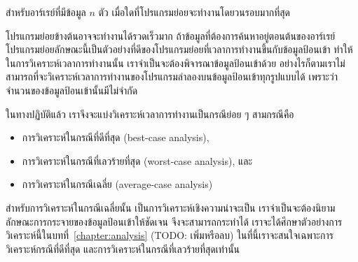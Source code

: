 \begin{quiz}{}
สำหรับ{\wbr}อาร์{\wbr}เรย์{\wbr}ที่{\wbr}มี{\wbr}ข้อมูล $n$ ตัว เมื่อใด{\wbr}ที่{\wbr}โปรแกรม{\wbr}ย่อย{\wbr}จะ{\wbr}ทำงาน{\wbr}โดย{\wbr}วน{\wbr}รอบ{\wbr}มาก{\wbr}ที่สุด{\wbr}
\end{quiz}

โปรแกรม{\wbr}ย่อย{\wbr}ข้าง{\wbr}ต้น{\wbr}อาจ{\wbr}จะ{\wbr}ทำงาน{\wbr}ได้{\wbr}รวดเร็ว{\wbr}มาก ถ้า{\wbr}ข้อมูล{\wbr}ที่{\wbr}ต้องการ{\wbr}ค้น{\wbr}หา{\wbr}อยู่{\wbr}ตอน{\wbr}ต้น{\wbr}ของ{\wbr}อาร์{\wbr}เรย์
โปรแกรม{\wbr}ย่อย{\wbr}ลักษณะ{\wbr}นี้{\wbr}เป็น{\wbr}ตัวอย่าง{\wbr}ที่{\wbr}ดี{\wbr}ของ{\wbr}โปรแกรม{\wbr}ย่อย{\wbr}ที่{\wbr}เวลา{\wbr}การ{\wbr}ทำงาน{\wbr}ขึ้น{\wbr}กับ{\wbr}ข้อมูล{\wbr}ป้อน{\wbr}เข้า{\wbr}
ทำให้{\wbr}ใน{\wbr}การ{\wbr}วิเคราะห์{\wbr}เวลา{\wbr}การ{\wbr}ทำงาน{\wbr}นั้น เรา{\wbr}จำเป็น{\wbr}จะ{\wbr}ต้อง{\wbr}พิจารณา{\wbr}ข้อมูล{\wbr}ป้อน{\wbr}เข้า{\wbr}ด้วย{\wbr}
อย่างไร{\wbr}ก็{\wbr}ตาม{\wbr}เรา{\wbr}ไม่{\wbr}สามารถ{\wbr}ที่{\wbr}จะ{\wbr}วิเคราะห์{\wbr}เวลา{\wbr}การ{\wbr}ทำงาน{\wbr}ของ{\wbr}โปรแกรม{\wbr}ลำลอง{\wbr}บน{\wbr}ข้อมูล{\wbr}ป้อน{\wbr}เข้า{\wbr}ทุก{\wbr}รูปแบบ{\wbr}ได้{\wbr}
เพราะ{\wbr}ว่า{\wbr}จำนวน{\wbr}ของ{\wbr}ข้อมูล{\wbr}ป้อน{\wbr}เข้า{\wbr}นั้น{\wbr}มี{\wbr}ไม่{\wbr}จำกัด{\wbr}

ใน{\wbr}ทาง{\wbr}ปฏิบัติ{\wbr}แล้ว เรา{\wbr}จึง{\wbr}จะ{\wbr}แบ่ง{\wbr}วิเคราะห์{\wbr}เวลา{\wbr}การ{\wbr}ทำงาน{\wbr}เป็น{\wbr}กรณี{\wbr}ย่อย ๆ สาม{\wbr}กรณี{\wbr}คือ{\wbr}
\begin{itemize}
\item การ{\wbr}วิเคราะห์{\wbr}ใน{\wbr}กรณี{\wbr}ที่{\wbr}ดี{\wbr}ที่สุด (best-case analysis),
\item การ{\wbr}วิเคราะห์{\wbr}ใน{\wbr}กรณี{\wbr}ที่{\wbr}เลว{\wbr}ร้าย{\wbr}ที่สุด (worst-case analysis), และ{\wbr}
\item การ{\wbr}วิเคราะห์{\wbr}ใน{\wbr}กรณี{\wbr}เฉลี่ย (average-case analysis)
\end{itemize}

สำหรับ{\wbr}การ{\wbr}วิเคราะห์{\wbr}ใน{\wbr}กรณี{\wbr}เฉลี่ย{\wbr}นั้น เป็น{\wbr}การ{\wbr}วิเคราะห์{\wbr}เชิง{\wbr}ความ{\wbr}น่า{\wbr}จะ{\wbr}เป็น{\wbr}
เรา{\wbr}จำเป็น{\wbr}จะ{\wbr}ต้อง{\wbr}นิยาม{\wbr}ลักษณะ{\wbr}การ{\wbr}กระจาย{\wbr}ของ{\wbr}ข้อมูล{\wbr}ป้อน{\wbr}เข้า{\wbr}ให้{\wbr}ชัดเจน จึง{\wbr}จะ{\wbr}สามารถ{\wbr}กระทำ{\wbr}ได้{\wbr}
เรา{\wbr}จะ{\wbr}ได้{\wbr}ศึกษา{\wbr}ตัวอย่าง{\wbr}การ{\wbr}วิเคราะห์{\wbr}นี้{\wbr}ใน{\wbr}บท{\wbr}ที่~\ref{chapter:analysis} (TODO:
เพิ่ม{\wbr}หรือ{\wbr}ลบ) ใน{\wbr}ที่{\wbr}นี้{\wbr}เรา{\wbr}จะ{\wbr}สนใจ{\wbr}เฉพาะ{\wbr}การ{\wbr}วิเคราะห์{\wbr}กรณี{\wbr}ที่{\wbr}ดี{\wbr}ที่สุด{\wbr}
และ{\wbr}การ{\wbr}วิเคราะห์{\wbr}ใน{\wbr}กรณี{\wbr}ที่{\wbr}เลว{\wbr}ร้าย{\wbr}ที่สุด{\wbr}เท่านั้น{\wbr}

